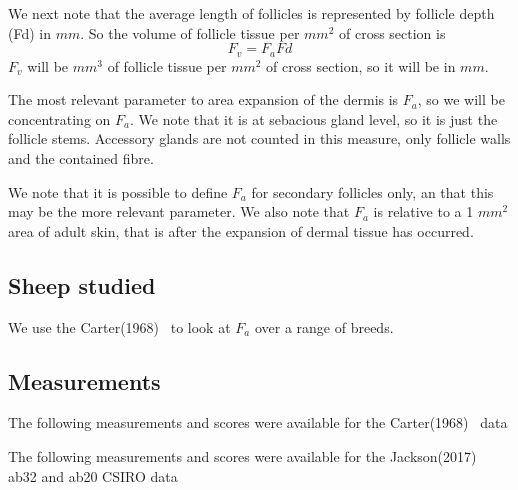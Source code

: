 \documentclass[titlepage]{article}  %
\begin{document}
We next note that the average length of follicles is represented by follicle depth (Fd) in $mm$.  So the volume of follicle tissue per $mm^{2}$  of cross section is
\begin{displaymath}
F_{v} = F_{a} Fd
\end{displaymath}
$F_{v}$ will be $mm^{3}$ of follicle tissue per $mm^{2}$ of cross section, so it will be in $mm$.

The most relevant parameter to area expansion of the dermis is $F_{a}$, so we will be concentrating on $F_{a}$. We note that it is at sebacious gland level, so it is just the follicle stems. Accessory glands are not counted in this measure, only follicle walls and the contained fibre.

We note that it is possible to define $F_{a}$ for secondary follicles only, an that this may be the more relevant parameter. We also note that $F_{a}$ is relative to a 1 $mm^{2}$ area of adult skin, that is after the expansion of dermal tissue has occurred.

\subsection{Sheep studied}
We use the Carter(1968)~\cite{cart:68} to look at $F_{a}$ over a range of breeds.

\subsection{Measurements}
The following measurements and scores were available for the Carter(1968)~\cite{cart:68} data
\begin{description}
\item[]
\end{description}

The following measurements and scores were available for the Jackson(2017)~\cite{jack:17a} ab32 and ab20 CSIRO data
\begin{description}
\item[]
\end{description}
\end{document}
